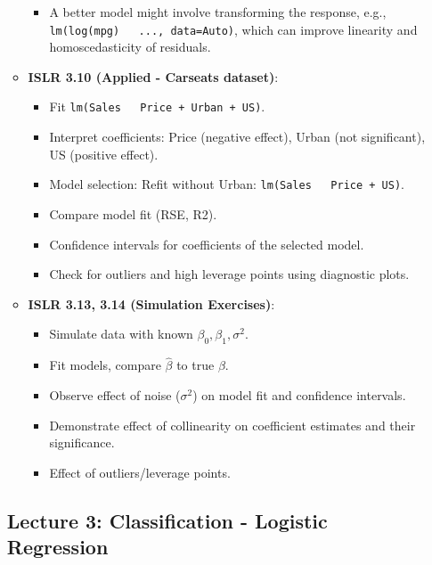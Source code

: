 \documentclass[12pt,a4paper]{article}
\newcommand{\Rcode}[1]{\texttt{#1}} %
\begin{document}
\begin{itemize}
\begin{itemize}
\begin{itemize}
                    \item A better model might involve transforming the response, e.g., \Rcode{lm(log(mpg) ~ ..., data=Auto)}, which can improve linearity and homoscedasticity of residuals.
                \end{itemize}
            \item \textbf{ISLR 3.10 (Applied - Carseats dataset)}:
                \begin{itemize}
                    \item Fit \Rcode{lm(Sales ~ Price + Urban + US)}.
                    \item Interpret coefficients: Price (negative effect), Urban (not significant), US (positive effect).
                    \item Model selection: Refit without Urban: \Rcode{lm(Sales ~ Price + US)}.
                    \item Compare model fit (RSE, R2).
                    \item Confidence intervals for coefficients of the selected model.
                    \item Check for outliers and high leverage points using diagnostic plots.
                \end{itemize}
            \item \textbf{ISLR 3.13, 3.14 (Simulation Exercises)}:
                \begin{itemize}
                    \item Simulate data with known $\beta_0, \beta_1, \sigma^2$.
                    \item Fit models, compare $\hat{\beta}$ to true $\beta$.
                    \item Observe effect of noise ($\sigma^2$) on model fit and confidence intervals.
                    \item Demonstrate effect of collinearity on coefficient estimates and their significance.
                    \item Effect of outliers/leverage points.
                \end{itemize}
        \end{itemize}
\subsection{Lecture 3: Classification - Logistic Regression}

\end{itemize}
\end{document}
